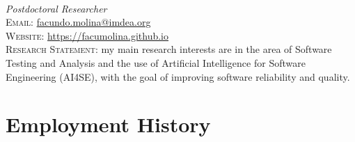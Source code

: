 \documentclass[a4paper,10pt]{article} %
\begin{document}
\pagestyle{empty} %


{} \\
\textit{Postdoctoral Researcher} \\
\textsc{Email:} \href{mailto:facundo.molina@imdea.org}{facundo.molina@imdea.org} \\
\textsc{Website:} \href{https://facumolina.github.io}{https://facumolina.github.io} \\

{\raggedleft
\textsc{Research Statement:} my main research interests are in the area of Software Testing and Analysis and the use of Artificial Intelligence for Software Engineering (AI4SE), with the goal of improving software reliability and quality.} \\

\section{Employment History}
\end{document}
